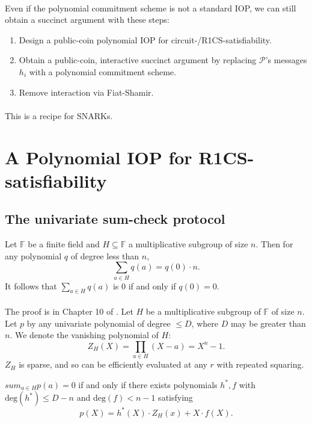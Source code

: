 \documentclass[11pt]{article}
\begin{document}
\paragraph{} Even if the polynomial commitment scheme is not a standard IOP, we can still obtain a succinct argument with these steps:
\begin{enumerate}
    \item Design a public-coin polynomial IOP for circuit-/R1CS-satisfiability.
    \item Obtain a public-coin, interactive succinct argument by replacing $\mathcal{P}$'s messages $h_i$ with a polynomial commitment scheme.
    \item Remove interaction via Fiat-Shamir.
\end{enumerate}
\paragraph{} This is a recipe for SNARKs.

\section{A Polynomial IOP for R1CS-satisfiability}
\subsection{The univariate sum-check protocol}
\begin{fact}
    Let $\mathbb{F}$ be a finite field and $H \subseteq \mathbb{F}$ a multiplicative subgroup of size $n$. Then for any polynomial $q$ of degree less than $n$,
    \[ \sum_{a \in H} q(a) = q(0) \cdot n. \]
    It follows that $\sum_{a \in H} q(a)$ is 0 if and only if $q(0) = 0$.
\end{fact}
\paragraph{} The proof is in Chapter 10 of \cite{tha22}. Let $H$ be a multiplicative subgroup of $\mathbb{F}$ of size $n$. Let $p$ by any univariate polynomial of degree $\leq D$, where $D$ may be greater than $n$. We denote the vanishing polynomial of $H$:
\[ Z_H(X) = \prod_{a \in H} (X - a) = X^n - 1. \]
$Z_H$ is sparse, and so can be efficiently evaluated at any $r$ with repeated squaring.

\begin{lemma}
    $sum_{a \in H} p(a) = 0$ if and only if there exists polynomials $h^*, f$ with $\text{deg}(h^*) \leq D - n$ and $\text{deg}(f) < n - 1$ satisfying
    \[ p(X) = h^*(X) \cdot Z_H(x) + X \cdot f(X). \]
\end{lemma}
\end{document}
